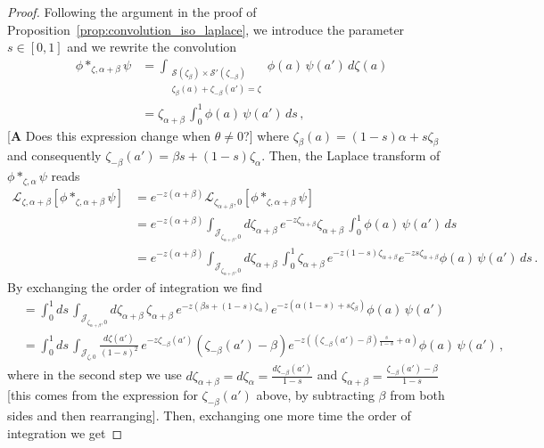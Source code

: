 \documentclass{article}
\newcommand{\laplace}{\mathcal{L}}
\theoremstyle{definition}
\theoremstyle{plain}
\newenvironment{todo}{\color{Coral}}{\color{black}}
\newenvironment{revised}{\color{DarkBlue}}{\color{black}}
\newenvironment{revised}{}{}
\begin{document}
\begin{proof}
\begin{revised}
Following the argument in the proof of Proposition~\ref{prop:convolution_iso_laplace}, we introduce the parameter $s\in [0,1]$ and we rewrite the convolution  
\begin{align*}
    \phi \ast_{\zeta, \alpha+\beta} \psi
    &=\int_{\substack{\mathcal{S}(\zeta_\beta) \times \mathcal{S}'(\zeta_{-\beta}) \\ \zeta_\beta(a) + \zeta_{-\beta}(a') = \zeta}} \phi(a)\,\psi(a')\,d\zeta(a)\\
    &=\zeta_{\alpha+\beta}\,\int_0^1 \phi(a)\,\psi(a')\,ds\,,
\end{align*}
\begin{todo}[\textbf{A} Does this expression change when $\theta \neq 0$?]\end{todo} where $\zeta_\beta(a)=(1-s)\alpha+s\zeta_\beta$ and consequently $\zeta_{-\beta}(a')=\beta s+(1-s)\zeta_\alpha$. Then, the Laplace transform of $\phi \ast_{\zeta, \alpha} \psi$ reads
\begin{align*}
    \laplace_{\zeta,\alpha+\beta}[{\phi}\ast_{\zeta, \alpha+\beta}{\psi}]&=e^{-z(\alpha+\beta)}\laplace_{\zeta_{\alpha+\beta},0}[{\phi}\ast_{\zeta, \alpha+\beta}{\psi}]\\
    &=e^{-z(\alpha+\beta)}\int_{\mathcal{J}_{\zeta_{\alpha+\beta},0}}d\zeta_{\alpha+\beta}\,e^{-z\zeta_{\alpha+\beta}}\zeta_{\alpha+\beta}\, \int_0^1 \phi(a)\,\psi(a')\,ds \\
    &=e^{-z(\alpha+\beta)}\int_{\mathcal{J}_{\zeta_{\alpha+\beta},0}}d\zeta_{\alpha+\beta}\, \int_0^1 \zeta_{\alpha+\beta}\,e^{-z(1-s)\zeta_{\alpha+\beta}} e^{-z s\zeta_{\alpha+\beta}} \phi(a)\, \psi(a')\,ds\,.
\end{align*}
By exchanging the order of integration we find 
\begin{align*}
&=\int_0^1 ds\,\int_{\mathcal{J}_{\zeta_{\alpha+\beta},0}}d\zeta_{\alpha+\beta}\,\zeta_{\alpha+\beta}\,e^{-z(\beta s+(1-s)\zeta_\alpha)} e^{-z(\alpha(1-s)+s\zeta_\beta)}\phi(a)\,\psi(a') \\
&=\int_0^1 ds\,\int_{\mathcal{J}_{\zeta,0}}\frac{d\zeta(a')}{(1-s)^2}\,e^{-z\zeta_{-\beta}(a')} (\zeta_{-\beta}(a')-\beta) e^{-z( (\zeta_{-\beta}(a')-\beta) \frac{s}{1-s}+\alpha)} \phi(a)\,\psi(a')\,,
\end{align*}
where in the second step we use $d\zeta_{\alpha+\beta}=d\zeta_\alpha=\frac{d\zeta_{-\beta}(a')}{1-s}$ and $\zeta_{\alpha+\beta}=\frac{\zeta_{-\beta}(a')-\beta}{1-s}$ \begin{todo}[this comes from the expression for $\zeta_{-\beta}(a')$ above, by subtracting $\beta$ from both sides and then rearranging]\end{todo}. Then, exchanging one more time the order of integration we get

\end{revised}
\end{proof}
\end{document}
